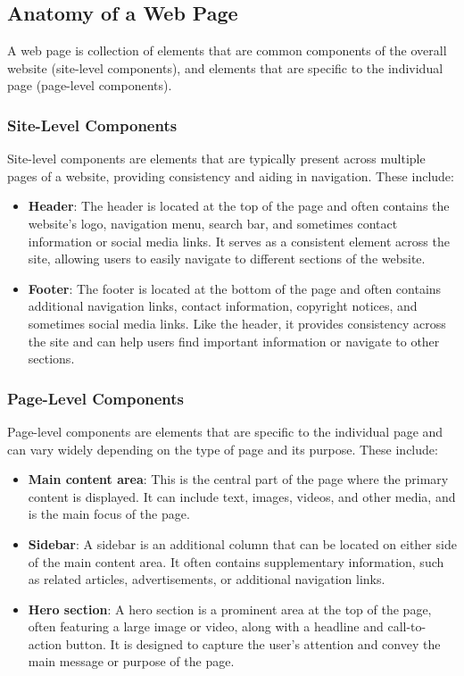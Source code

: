\subsection{Anatomy of a Web Page}\label{subsec:anatomy-of-a-web-page}

A web page is collection of elements that are common components of the overall website (site-level components), and elements that are specific to the individual page (page-level components)\cite{WixPartsOfWebsite}.

\subsubsection{Site-Level Components}\label{subsubsec:site-level-components}
Site-level components are elements that are typically present across multiple pages of a website, providing consistency and aiding in navigation.
These include:
\begin{itemize}
    \item \textbf{Header}: The header is located at the top of the page and often contains the website's logo, navigation menu, search bar, and sometimes contact information or social media links.
    It serves as a consistent element across the site, allowing users to easily navigate to different sections of the website.
    \item \textbf{Footer}: The footer is located at the bottom of the page and often contains additional navigation links, contact information, copyright notices, and sometimes social media links.
    Like the header, it provides consistency across the site and can help users find important information or navigate to other sections.
\end{itemize}

\subsubsection{Page-Level Components}\label{subsubsec:page-level-components}
Page-level components are elements that are specific to the individual page and can vary widely depending on the type of page and its purpose.
These include:
\begin{itemize}
    \item \textbf{Main content area}: This is the central part of the page where the primary content is displayed.
    It can include text, images, videos, and other media, and is the main focus of the page.
    \item \textbf{Sidebar}: A sidebar is an additional column that can be located on either side of the main content area.
    It often contains supplementary information, such as related articles, advertisements, or additional navigation links.
    \item \textbf{Hero section}: A hero section is a prominent area at the top of the page, often featuring a large image or video, along with a headline and call-to-action button.
    It is designed to capture the user's attention and convey the main message or purpose of the page.
\end{itemize}


